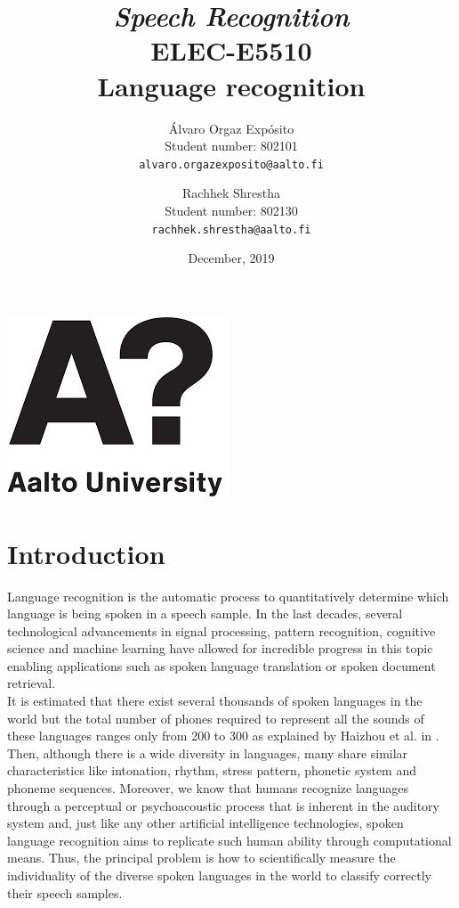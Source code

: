 \documentclass[12pt]{extarticle}
\title{\Huge \emph{Speech Recognition} \\ ELEC-E5510 \vspace{1cm} \\ Language recognition \vspace{1cm}}
\author{
Álvaro Orgaz Expósito \\ Student number: 802101 \\ \texttt{alvaro.orgazexposito@aalto.fi}
\and
Rachhek Shrestha \\ Student number: 802130 \\ \texttt{rachhek.shrestha@aalto.fi}
}
\date{\vspace{1cm} December, 2019}
\begin{document}
\maketitle

\begin{center} \vspace{\fill} \includegraphics[scale=1]{Figures/AaltoLogo.png} \vspace{5cm} \end{center}

\newpage

\tableofcontents

\newpage

\section{Introduction}

Language recognition is the automatic process to quantitatively determine which language is being spoken in a speech sample. In the last decades, several technological advancements in signal processing, pattern recognition, cognitive science and machine learning have allowed for incredible progress in this topic enabling applications such as spoken language translation or spoken document retrieval.\\

\noindent It is estimated that there exist several thousands of spoken languages in the world but the total number of phones required to represent all the sounds of these languages ranges only from 200 to 300 as explained by Haizhou et al. in \cite{Li2013SpokenLR}. Then, although there is a wide diversity in languages, many share similar characteristics like intonation, rhythm, stress pattern, phonetic system and phoneme sequences. Moreover, we know that humans recognize languages through a perceptual or psychoacoustic process that is inherent in the auditory system and, just like any other artificial intelligence technologies, spoken language recognition aims to replicate such human ability through computational means. Thus, the principal problem is how to scientifically measure the individuality of the diverse spoken languages in the world to classify correctly their speech samples.\\
\end{document}
